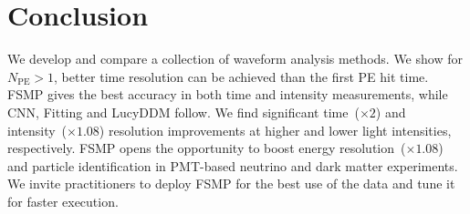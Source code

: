 \section{Conclusion}
\label{sec:conclusion}

We develop and compare a collection of waveform analysis methods.  We show for $N_\mathrm{PE} > 1$, better time resolution can be achieved than the first PE hit time.  FSMP gives the best accuracy in both time and intensity measurements, while CNN, Fitting and LucyDDM follow.  We find significant time~($\times 2$) and intensity~($\times 1.08$) resolution improvements at higher and lower light intensities, respectively.    FSMP opens the opportunity to boost energy resolution~($\times 1.08$) and particle identification in PMT-based neutrino and dark matter experiments.  We invite practitioners to deploy FSMP for the best use of the data and tune it for faster execution.
